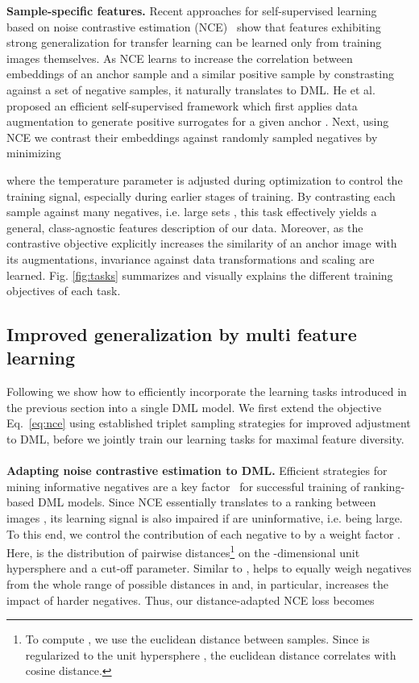 \documentclass[runningheads]{llncs}
\begin{document}
\noindent
\textbf{Sample-specific features.} 
Recent approaches for self-supervised learning~\cite{cpc,moco,bachman2019amdim} based on noise contrastive estimation (NCE)~\cite{nce} show that features exhibiting strong generalization for transfer learning can be learned only from training images themselves. As NCE learns to increase the correlation between embeddings of an anchor sample and a similar positive sample by constrasting against a set of negative samples, it naturally translates to DML. He et al.~\cite{moco} proposed an efficient self-supervised framework which first applies data augmentation to generate positive surrogates  for a given anchor . Next, using NCE we contrast their embeddings  against randomly sampled negatives  by minimizing



\noindent
where the temperature parameter  is adjusted during optimization to control the training signal, especially during earlier stages of training. By contrasting each sample against many negatives, i.e. large sets , this task effectively yields a general, class-agnostic features description of our data. Moreover, as the contrastive objective explicitly increases the similarity of an anchor image with its augmentations, invariance against data transformations and scaling are learned. Fig. \ref{fig:tasks} summarizes and visually explains the different training objectives of each task.

\subsection{Improved generalization by multi feature learning}
\label{sec:Method_Details}

Following we show how to efficiently incorporate the learning tasks introduced in the previous section into a single DML model. We first extend the objective Eq.~\ref{eq:nce} using established triplet sampling strategies for improved adjustment to DML, before we jointly train our learning tasks for maximal feature diversity.  
\\
\\
\noindent
\textbf{Adapting noise contrastive estimation to DML.}
Efficient strategies for mining informative negatives  are a key factor~\cite{semihard} for successful training of ranking-based DML models. Since NCE essentially translates to a ranking between images , its learning signal is also impaired if  are uninformative, i.e.  being large. To this end, we control the contribution of each negative  to  by a weight factor . Here,  is the distribution of pairwise distances\footnote{To compute , we use the euclidean distance between samples. Since  is regularized to the unit hypersphere , the euclidean distance correlates with cosine distance.} on the -dimensional unit hypersphere  and  a cut-off parameter. Similar to \cite{margin},  helps to equally weigh negatives from the whole range of possible distances in  and, in particular, increases the impact of harder negatives. Thus, our distance-adapted NCE loss becomes
\end{document}
